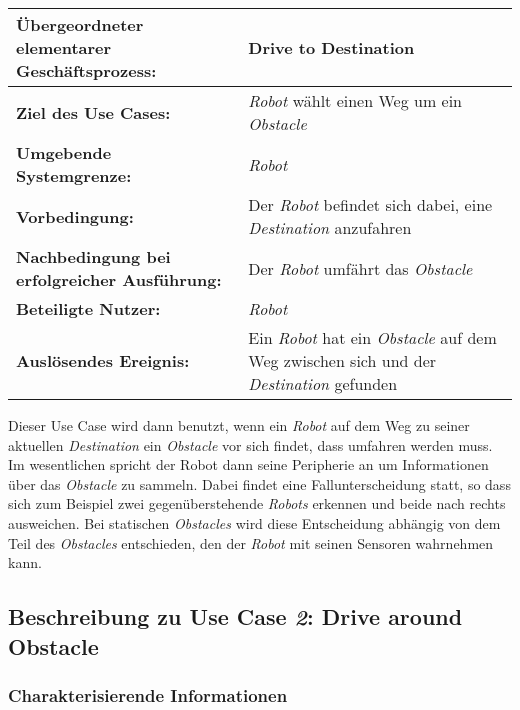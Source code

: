 			\begin{table}[H]
				\centering
				\begin{tabularx}{\textwidth}{@{}p{5cm}X@{}}
				\hline
				\textbf{Übergeordneter elementarer Geschäftsprozess:} & Drive to Destination\\ \hline
				\textbf{Ziel des Use Cases:} & \emph{Robot} wählt einen Weg um ein \emph{Obstacle} \\ \hline
				\textbf{Umgebende Systemgrenze:} & \emph{Robot} \\ \hline
				\textbf{Vorbedingung:} & Der \emph{Robot} befindet sich dabei, eine \emph{Destination} anzufahren \\ \hline
				\textbf{Nachbedingung bei erfolgreicher Ausführung:} & 
				Der \emph{Robot} umfährt das \emph{Obstacle} \\ \hline
				\textbf{Beteiligte Nutzer:} & \emph{Robot} \\ \hline
				\textbf{Auslösendes Ereignis:} & Ein \emph{Robot} hat ein \emph{Obstacle} auf dem Weg zwischen sich und der \emph{Destination} gefunden\\ \hline
				\end{tabularx}
			\end{table}

			Dieser Use Case wird dann benutzt, wenn ein \emph{Robot} auf dem Weg zu seiner aktuellen \emph{Destination} ein \emph{Obstacle} vor sich findet, dass umfahren werden muss. Im wesentlichen spricht der Robot dann seine Peripherie an um Informationen über das \emph{Obstacle} zu sammeln. Dabei findet eine Fallunterscheidung statt, so dass sich zum Beispiel zwei gegenüberstehende \emph{Robots} erkennen und beide nach rechts ausweichen. Bei statischen \emph{Obstacles} wird diese Entscheidung abhängig von dem Teil des \emph{Obstacles} entschieden, den der \emph{Robot} mit seinen Sensoren wahrnehmen kann.
		
		\pagebreak
		
		
		\subsection{Beschreibung zu Use Case \emph{2}: Drive around Obstacle}

			\subsubsection*{Charakterisierende Informationen}

